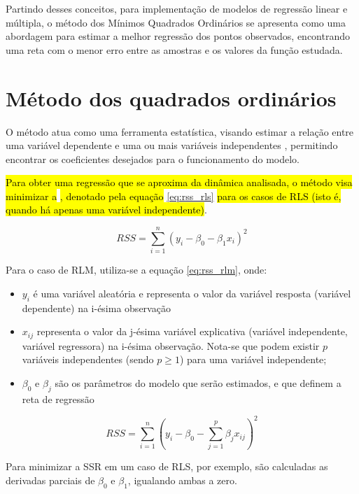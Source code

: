 Partindo desses conceitos, para implementação de modelos de regressão linear e múltipla, o método dos Mínimos Quadrados Ordinários se apresenta como uma abordagem para estimar a melhor regressão dos pontos observados, encontrando uma reta com o menor erro entre as amostras e os valores da função estudada.

\section{Método dos quadrados ordinários}

O método  atua como uma ferramenta estatística, visando estimar a relação entre uma variável dependente e uma ou mais variáveis independentes \cite{Alkama2020}, permitindo encontrar os coeficientes desejados para o funcionamento do modelo.

\hl{Para obter uma regressão que se aproxima da dinâmica analisada, o método visa minimizar a} \hl{, denotado pela equação} \ref{eq:rss_rls} \hl{para os casos de RLS (isto é, quando há apenas uma variável independente)}.

\begin{equation}
	RSS = \sum_{i=1}^{n} \left(y_i - \beta_0 - \beta_1x_{i}\right)^2
	\label{eq:rss_rls}
\end{equation}

Para o caso de \gls{RLM}, utiliza-se a equação \ref{eq:rss_rlm}, onde:

\begin{itemize}
    \item $y_i$ é uma variável aleatória e representa o valor da variável resposta (variável dependente) na i-ésima observação
    \item $x_{ij}$ representa o valor da j-ésima variável explicativa (variável independente, variável regressora) na i-ésima observação. Nota-se que podem existir $p$ variáveis independentes (sendo $p \geq 1$) para uma variável independente; 
    \item $\beta_{0}$ e $\beta_{j}$ são os parâmetros do modelo que serão estimados, e que definem a reta de regressão
\end{itemize}

\begin{equation}
    RSS = \sum_{i=1}^{n} \left(y_i - \beta_0 - \sum_{j=1}^{p}\beta_jx_{ij}\right)^2
	\label{eq:rss_rlm}
\end{equation}

Para minimizar a SSR em um caso de RLS, por exemplo, são calculadas as derivadas parciais de $\beta_0$ e $\beta_1$, igualando ambas a zero.

